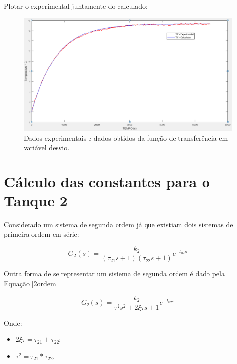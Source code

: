 Plotar o experimental juntamente do calculado:

\begin{figure}[H]
	\begin{center}
		\includegraphics[scale=.5, trim={0 0 0 0}]{figuras/ladeq/dina/graph1}
		\caption{Dados experimentais e dados obtidos da função de transferência em variável desvio.}
		\label{iFix}
	\end{center}
\end{figure}


\section{Cálculo das constantes para o Tanque 2}

Considerado um sistema de segunda ordem já que existiam dois sistemas de primeira ordem em série:

\begin{equation}\label{key}
G_{2}(s)=\frac{k_{2}}{\left(\tau_{21} s+1\right)\left(\tau_{22} s+1\right)} e^{-t_{02} s}
\end{equation}

Outra forma de se representar um sistema de segunda ordem é dado pela Equação \ref{2ordem}

\begin{equation}\label{2ordem}
G_{2}(s)=\frac{k_{2}}{\tau^{2} s^{2}+2 \xi \tau s+1} e^{-t_{02} s}
\end{equation}


Onde:

\begin{itemize}
	\item $ 2 \xi \tau=\tau_{21}+\tau_{22} $;
	\item $ \tau^{2}=\tau_{21} * \tau_{22} $.
\end{itemize}


